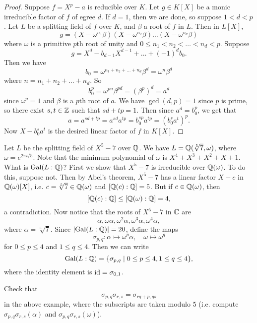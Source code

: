 \begin{proof}
  Suppose $f = X^p - a$ is reducible over $K$. Let
  $g \in K[X]$ be a monic irreducible factor of $f$ of
  egree $d$. If $d = 1$, then we are done, so suppose
  $1 < d < p$. Let $L$ be a splitting field of $f$
  over $K$, and $\beta$ a root of $f$ in $L$. Then in
  $L[X]$,
  \[
    g = (X - \omega^{n_1} \beta) (X - \omega^{n_2} \beta) \dots (X - \omega^{n_d} \beta)
  \]
  where $\omega$ is a primitive $p$th root of unity and
  $0 \le n_1 < n_2 < \dots < n_d < p$. Suppose
  \[
    g = X^d - b_{d - 1} X^{d - 1} + \dots + (-1)^d b_0.
  \]
  Then we have
  \[
    b_0 = \omega^{n_1 + n_2 + \dots + n_d} \beta^d
    = \omega^n \beta^d
  \]
  where $n = n_1 + n_2 + \dots + n_d$. So
  \[
    b_0^p = \omega^{pn} \beta^{pd} = (\beta^p)^d = a^d
  \]
  since $\omega^p = 1$ and $\beta$ is a $p$th root of $a$. We have
  $\gcd(d, p) = 1$ since $p$ is prime, so there exist
  $s, t \in \mathbb{Z}$ such that
  $sd + tp = 1$.
  Then since $a^d = b_0^p$, we get that
  \[
    a = a^{sd + tp} = a^{sd} a^{tp} = b_0^{sp} a^{tp}
    = (b_0^s a^t)^p.
  \]
  Now $X - b_0^s a^t$ is the desired linear factor of $f$
  in $K[X]$.
\end{proof}

\begin{example}
  \label{ex:splitting-field-of-x5-7-over-q}
  Let $L$ be the splitting field of $X^5 - 7$ over
  $\mathbb{Q}$. We have $L = \mathbb{Q}(\sqrt[5]{7}, \omega)$, where
  $\omega = e^{2\pi i / 5}$. Note that the minimum
  polynomial of $\omega$ is
  $X^4 + X^3 + X^2 + X + 1$.
  What is $\operatorname{Gal}(L : \mathbb{Q})$? First we show that
  $X^5 - 7$ is irreducible over $\mathbb{Q}(\omega)$. To do this,
  suppose not. Then by Abel's theorem, $X^5 - 7$ has a
  linear factor $X - c$ in $\mathbb{Q}(\omega)[X]$, i.e.
  $c = \sqrt[5]{7} \in \mathbb{Q}(\omega)$ and
  $[\mathbb{Q}(c) : \mathbb{Q}] = 5$. But if $c \in \mathbb{Q}(\omega)$, then
  \[
    [\mathbb{Q}(c) : \mathbb{Q}] \le [\mathbb{Q}(\omega) : \mathbb{Q}] = 4,
  \]
  a contradiction. Now notice that the roots of $X^5 - 7$ in $\mathbb{C}$ are
  \[
    \alpha, \omega \alpha, \omega^2 \alpha, \omega^3 \alpha, \omega^4 \alpha,
  \]
  where $\alpha = \sqrt[5]{7}$. Since
  $|{\operatorname{Gal}(L : \mathbb{Q})}| = 20$, define the maps
  \[
    \sigma_{p, q} : \alpha \mapsto \omega^p \alpha, \quad \omega \mapsto \omega^q
  \]
  for $0 \le p \le 4$ and $1 \le q \le 4$. Then we can
  write
  \[
    \operatorname{Gal}(L : \mathbb{Q}) = \{\sigma_{p, q} \mid 0 \le p \le 4, 1 \le q \le 4\},
  \]
  where the identity element is $\mathrm{id} = \sigma_{0, 1}$.
\end{example}

\begin{exercise}
  Check that
  \[\sigma_{p, q} \sigma_{r, s} = \sigma_{rq + p, qs}\]
  in the above example,
  where the subscripts are taken modulo $5$ (i.e.
  compute $\sigma_{p, q} \sigma_{r, s}(\alpha)$
  and $\sigma_{p, q} \sigma_{r, s}(\omega)$).
\end{exercise}
